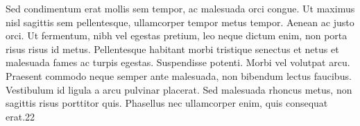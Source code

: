 Sed condimentum erat mollis sem tempor, ac malesuada orci congue. Ut maximus nisl sagittis sem pellentesque, ullamcorper tempor metus tempor. Aenean ac justo orci. Ut fermentum, nibh vel egestas pretium, leo neque dictum enim, non porta risus risus id metus. Pellentesque habitant morbi tristique senectus et netus et malesuada fames ac turpis egestas. Suspendisse potenti. Morbi vel volutpat arcu. Praesent commodo neque semper ante malesuada, non bibendum lectus faucibus. Vestibulum id ligula a arcu pulvinar placerat. Sed malesuada rhoncus metus, non sagittis risus porttitor quis. Phasellus nec ullamcorper enim, quis consequat erat.22
